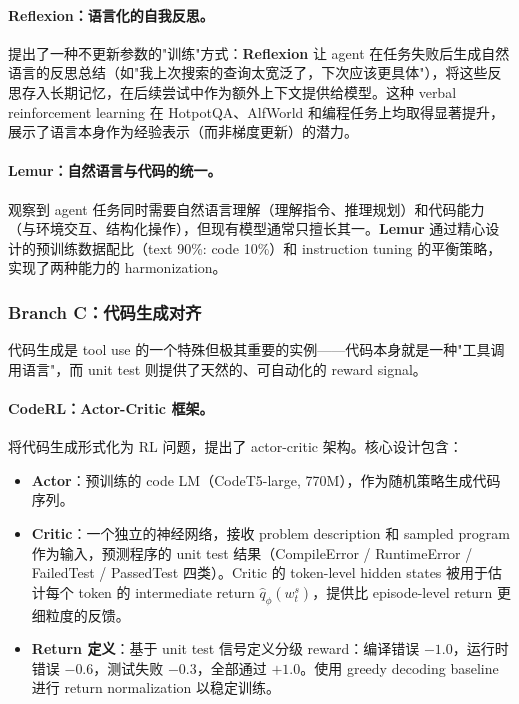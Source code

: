 \paragraph{Reflexion：语言化的自我反思。}
\citet{shinn2023reflexion} 提出了一种不更新参数的"训练"方式：\textbf{Reflexion} 让 agent 在任务失败后生成自然语言的反思总结（如"我上次搜索的查询太宽泛了，下次应该更具体"），将这些反思存入长期记忆，在后续尝试中作为额外上下文提供给模型。这种 verbal reinforcement learning 在 HotpotQA、AlfWorld 和编程任务上均取得显著提升，展示了语言本身作为经验表示（而非梯度更新）的潜力。

\paragraph{Lemur：自然语言与代码的统一。}
\citet{xu2023lemur} 观察到 agent 任务同时需要自然语言理解（理解指令、推理规划）和代码能力（与环境交互、结构化操作），但现有模型通常只擅长其一。\textbf{Lemur} 通过精心设计的预训练数据配比（text 90\%: code 10\%）和 instruction tuning 的平衡策略，实现了两种能力的 harmonization。

\subsubsection{Branch C：代码生成对齐}

代码生成是 tool use 的一个特殊但极其重要的实例——代码本身就是一种"工具调用语言"，而 unit test 则提供了天然的、可自动化的 reward signal。

\paragraph{CodeRL：Actor-Critic 框架。}
 将代码生成形式化为 RL 问题，提出了 actor-critic 架构。核心设计包含：

\begin{itemize}[leftmargin=*]
  \item \textbf{Actor}：预训练的 code LM（CodeT5-large, 770M），作为随机策略生成代码序列。
  \item \textbf{Critic}：一个独立的神经网络，接收 problem description 和 sampled program 作为输入，预测程序的 unit test 结果（CompileError / RuntimeError / FailedTest / PassedTest 四类）。Critic 的 token-level hidden states 被用于估计每个 token 的 intermediate return $\hat{q}_{\phi}(w_t^s)$，提供比 episode-level return 更细粒度的反馈。
  \item \textbf{Return 定义}：基于 unit test 信号定义分级 reward：编译错误 $-1.0$，运行时错误 $-0.6$，测试失败 $-0.3$，全部通过 $+1.0$。使用 greedy decoding baseline 进行 return normalization 以稳定训练。
\end{itemize}


